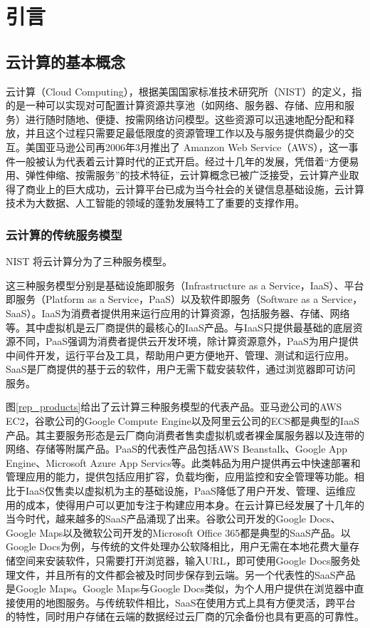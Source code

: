 
\chapter{引言}

\section{云计算的基本概念}

云计算（Cloud Computing），根据美国国家标准技术研究所（NIST）的定义，指的是一种可以实现对可配置计算资源共享池（如网络、服务器、存储、应用和服务）进行随时随地、便捷、按需网络访问模型。这些资源可以迅速地配分配和释放，并且这个过程只需要足最低限度的资源管理工作以及与服务提供商最少的交互。美国亚马逊公司再2006年3月推出了 Amanzon Web Service（AWS）\parencite{aws}，这一事件一般被认为代表着云计算时代的正式开启。经过十几年的发展，凭借着“方便易用、弹性伸缩、按需服务”的技术特征，云计算概念已被广泛接受，云计算产业取得了商业上的巨大成功，云计算平台已成为当今社会的关键信息基础设施，云计算技术为大数据、人工智能的领域的蓬勃发展特工了重要的支撑作用。

\subsection{云计算的传统服务模型}

NIST 将云计算分为了三种服务模型。

这三种服务模型分别是基础设施即服务（Infrastructure as a Service，IaaS）、平台即服务（Platform as a Service，PaaS）以及软件即服务（Software as a Service，SaaS）。IaaS为消费者提供用来运行应用的计算资源，包括服务器、存储、网络等。其中虚拟机是云厂商提供的最核心的IaaS产品。与IaaS只提供最基础的底层资源不同，PaaS强调为消费者提供云开发环境，除计算资源意外，PaaS为用户提供中间件开发，运行平台及工具，帮助用户更方便地开、管理、测试和运行应用。SaaS是厂商提供的基于云的软件，用户无需下载安装软件，通过浏览器即可访问服务。

图\ref{rep_products}给出了云计算三种服务模型的代表产品。亚马逊公司的AWS EC2，谷歌公司的Google Compute Engine\parencite{googlecloud}以及阿里云公司的ECS都是典型的IaaS产品。其主要服务形态是云厂商向消费者售卖虚拟机或者裸金属服务器以及连带的网络、存储等附属产品。PaaS的代表性产品包括AWS Beanstalk、Google App Engine、Microsoft Azure App Servics等。此类韩品为用户提供再云中快速部署和管理应用的能力，提供包括应用扩容，负载均衡，应用监控和安全管理等功能。相比于IaaS仅售卖以虚拟机为主的基础设施，PaaS降低了用户开发、管理、运维应用的成本，使得用户可以更加专注于构建应用本身。在云计算已经发展了十几年的当今时代，越来越多的SaaS产品涌现了出来。谷歌公司开发的Google Docs、Google Maps以及微软公司开发的Microsoft Office 365都是典型的SaaS产品。以Google Docs为例，与传统的文件处理办公软降相比，用户无需在本地花费大量存储空间来安装软件，只需要打开浏览器，输入URL，即可使用Google Docs服务处理文件，并且所有的文件都会被及时同步保存到云端。另一个代表性的SaaS产品是Google Maps。Google Maps与Google Docs类似，为个人用户提供在浏览器中直接使用的地图服务。与传统软件相比，SaaS在使用方式上具有方便灵活，跨平台的特性，同时用户存储在云端的数据经过云厂商的冗余备份也具有更高的可靠性。

